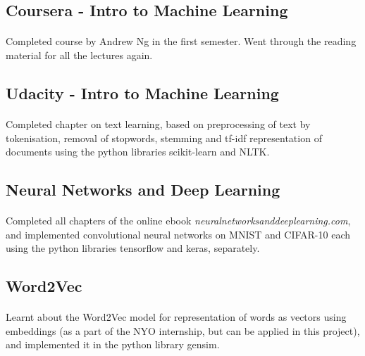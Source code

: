 \documentclass{report}
\begin{document}
        \subsection*{\fontsize{16}{20}\selectfont Coursera - Intro to Machine Learning}
        	\vspace{+1mm}\paragraph{}{\fontsize{13}{16}\selectfont Completed course by Andrew Ng in the first semester. Went through the reading material for all the lectures again.}\\[-2mm]
        
        \subsection*{\fontsize{16}{20}\selectfont Udacity - Intro to Machine Learning}
        	\vspace{+1mm}\paragraph{}{\fontsize{13}{16}\selectfont Completed chapter on text learning, based on preprocessing of text by tokenisation, removal of stopwords, stemming and tf-idf representation of documents using the python libraries scikit-learn and NLTK.}\\[-2mm]
        
        \subsection*{\fontsize{16}{20}\selectfont Neural Networks and Deep Learning}
        	\vspace{+1mm}\paragraph{}{\fontsize{13}{16}\selectfont Completed all chapters of the online ebook \textit{neuralnetworksanddeeplearning.com}, and implemented convolutional neural networks on MNIST and CIFAR-10 each using the python libraries tensorflow and keras, separately.}\\[-2mm]
        
        \subsection*{\fontsize{16}{20}\selectfont Word2Vec}
        	\vspace{+1mm}\paragraph{}{\fontsize{13}{16}\selectfont Learnt about the Word2Vec model for representation of words as vectors using embeddings (as a part of the NYO internship, but can be applied in this project), and implemented it in the python library gensim.}
        
    
\end{document}
